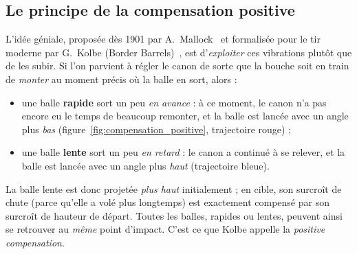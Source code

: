 \documentclass[12pt,a4paper]{article}
\begin{document}
	\subsection{Le principe de la compensation positive}

	L'idée géniale, proposée dès 1901 par A.\ Mallock~\cite{Mallock} et formalisée pour le tir moderne par G.\ Kolbe (Border Barrels)~\cite{Kolbe,KolbeWeb}, est d'\emph{exploiter} ces vibrations plutôt que de les subir. Si l'on parvient à régler le canon de sorte que la bouche soit en train de \emph{monter} au moment précis où la balle en sort, alors :

	\begin{itemize}
		\item une balle \textbf{rapide} sort un peu \emph{en avance} : à ce moment, le canon n'a pas encore eu le temps de beaucoup remonter, et la balle est lancée avec un angle plus \emph{bas} (figure~\ref{fig:compensation_positive}, trajectoire rouge) ;
		\item une balle \textbf{lente} sort un peu \emph{en retard} : le canon a continué à se relever, et la balle est lancée avec un angle plus \emph{haut} (trajectoire bleue).
	\end{itemize}

	La balle lente est donc projetée \emph{plus haut} initialement ; en cible, son surcroît de chute (parce qu'elle a volé plus longtemps) est exactement compensé par son surcroît de hauteur de départ. Toutes les balles, rapides ou lentes, peuvent ainsi se retrouver au \emph{même} point d'impact. C'est ce que Kolbe appelle la \emph{positive compensation}.
\end{document}
